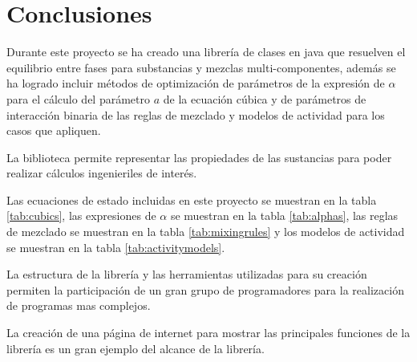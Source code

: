 \chapter{Conclusiones}\label{chap:conclusions}

	Durante este proyecto se ha creado una librería de clases en java que resuelven el equilibrio entre fases para substancias y mezclas multi-componentes, además se ha logrado incluir métodos de optimización de parámetros de la expresión de $\alpha$ para el cálculo del parámetro $a$ de la ecuación cúbica y de parámetros de interacción binaria de las reglas de mezclado y modelos de actividad para los casos que apliquen.

	La biblioteca permite representar las propiedades de las sustancias para poder realizar cálculos ingenieriles de interés.

	Las ecuaciones de estado incluidas en este proyecto se muestran en la tabla \ref{tab:cubics}, las expresiones de $\alpha$ se muestran en la tabla \ref{tab:alphas}, las reglas de mezclado se muestran en la tabla \ref{tab:mixingrules} y los modelos de actividad se muestran en la tabla \ref{tab:activitymodels}.

	La estructura de la librería y las herramientas utilizadas para su creación permiten la participación de un gran grupo de programadores para la realización de programas mas complejos.

	La creación de una página de internet para mostrar las principales funciones de la librería es un gran ejemplo del alcance de la librería.

